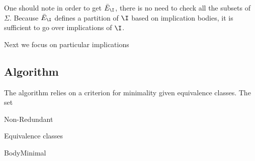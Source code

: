 One should note in order to get $\bar{E}_{\I}$, there is no need to check all
the subsets of $\Sigma$. Because $\bar{E}_{\I}$ defines a partition of $\I$ 
based on implication bodies, it is sufficient to go over implications of $\I$.

\vspace{1.2em}

Next we focus on particular implications


\subsection{Algorithm}

The algorithm relies on a criterion for minimality given equivalence classes. 
The set 



\begin{algorithm}[H]
	
	
	\caption{Non-Redundant}
	\label{alg:Nonredun}
\end{algorithm}

\vspace{1.2em}

\begin{algorithm}[H]
	
	
	\caption{Equivalence classes}
	\label{alg:Equiv}
	
\end{algorithm}

\begin{algorithm}[H]
	
	
	\caption{BodyMinimal}
\end{algorithm}	


